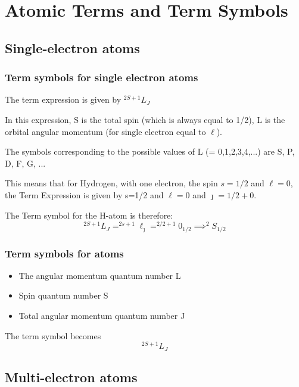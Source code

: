 \documentclass[a4paper,titlepage]{article}
\begin{document}
\section{Atomic Terms and Term Symbols}
\subsection{Single-electron atoms}

\begin{frame}
\frametitle{Term symbols for single electron atoms}
The term expression is given by \(^{2S+1}L_J\) \newline

\bigskip In this expression, S is the total spin (which is always equal to 1/2), L is the orbital angular momentum (for single electron equal to \(\ell\)).\newline

\medskip The symbols corresponding to the possible values of L (= 0,1,2,3,4,...) are S, P, D, F, G, ...\newline

\medskip This means that for Hydrogen, with one electron, the spin \(s=1/2\) and \(\ell=0\), the Term Expression is given by s=1/2 and \(\ell=0\) and \(\jmath = 1/2 + 0\). \newline

\medskip The Term symbol for the H-atom is therefore:
\[^{2S+1}L_J = ^{2s+1}\ell_\jmath = ^{2/2 + 1}0_{1/2} \implies ^2S_{1/2}\]
\end{frame}

\begin{frame}
\frametitle{Term symbols for atoms}
\begin{itemize}
\item The angular momentum quantum number L
\item Spin quantum number S
\item Total angular momentum quantum number J
\end{itemize}

\bigskip The term symbol becomes \[ ^{2S+1}L_J\]
\end{frame}

\subsection{Multi-electron atoms}
\end{document}
